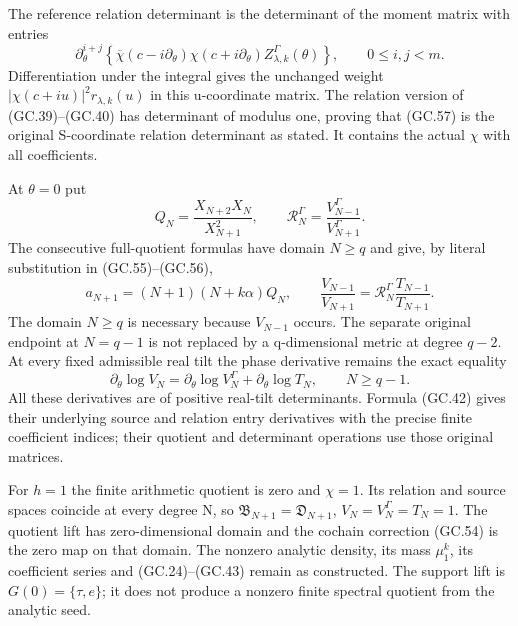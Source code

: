 \documentclass[11pt]{article}
\begin{document}
The reference relation determinant is the determinant of the
moment matrix with entries
\[
 \partial_\theta^{i+j}\left\{
  \overline\chi(c-i\partial_\theta)\chi(c+i\partial_\theta)
                  Z_{\lambda,k}^\Gamma(\theta)\right\},
       \qquad0\le i,j<m.                                     \tag{GC.57}
\]
Differentiation under the integral gives the unchanged weight
$|\chi(c+iu)|^2r_{\lambda,k}(u)$ in this u-coordinate matrix.
The relation version of (GC.39)--(GC.40) has determinant of modulus
one, proving that (GC.57) is the original S-coordinate relation
determinant as stated. It contains the actual $\chi$ with all coefficients.

At $\theta=0$ put
\[
 Q_N=\frac{X_{N+2}X_N}{X_{N+1}^2},\qquad
 \mathcal R_N^\Gamma=\frac{V_{N-1}^\Gamma}{V_{N+1}^\Gamma}.
\]
The consecutive full-quotient formulas have domain $N\ge q$ and
give, by literal substitution in (GC.55)--(GC.56),
\[
 a_{N+1}=(N+1)(N+k\alpha)Q_N,\qquad
 \frac{V_{N-1}}{V_{N+1}}
     =\mathcal R_N^\Gamma\frac{T_{N-1}}{T_{N+1}}.
                                                               \tag{GC.58}
\]
The domain $N\ge q$ is necessary because $V_{N-1}$ occurs. The
separate original endpoint at $N=q-1$ is not replaced by a
q-dimensional metric at degree $q-2$. At every fixed admissible
real tilt the phase derivative remains the exact equality
\[
 \partial_\theta\log V_N
   =\partial_\theta\log V_N^\Gamma+
                              \partial_\theta\log T_N,
                       \qquad N\ge q-1.                       \tag{GC.59}
\]
All these derivatives are of positive real-tilt determinants. Formula
(GC.42) gives their underlying source and relation entry derivatives
with the precise finite coefficient indices; their quotient and
determinant operations use those original matrices.

For $h=1$ the finite arithmetic quotient is zero and $\chi=1$.
Its relation and source spaces coincide at every degree N, so
$\mathfrak B_{N+1}=\mathfrak D_{N+1}$,
$V_N=V_N^\Gamma=T_N=1$. The quotient lift has zero-dimensional
domain and the cochain correction (GC.54) is the zero map on that
domain. The nonzero analytic density, its mass $\mu_1^k$, its
coefficient series and (GC.24)--(GC.43) remain as constructed.
The support lift is $G(0)=\{\tau,e\}$; it does not produce a
nonzero finite spectral quotient from the analytic seed.
\end{document}
